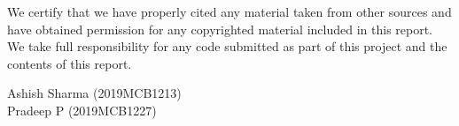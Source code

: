 


\begin{honorcode}      %

We certify that we have properly cited any material taken from other sources and have obtained permission for any
copyrighted material included in this report. We take full responsibility for any code submitted as part of this 
project and the contents of this report. \\



\begin{flushright}
Ashish Sharma (2019MCB1213)\\ Pradeep P (2019MCB1227)  \\ 
\end{flushright}

\end{honorcode}



